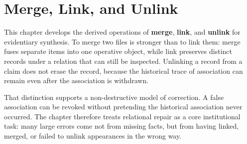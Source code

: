 
\chapter{Merge, Link, and Unlink}
\label{ch:ch049}

This chapter develops the derived operations of \textbf{merge}, \textbf{link}, and \textbf{unlink} for evidentiary synthesis. To merge two files is stronger than to link them: merge fuses separate items into one operative object, while link preserves distinct records under a relation that can still be inspected. Unlinking a record from a claim does not erase the record, because the historical trace of association can remain even after the association is withdrawn.

That distinction supports a non-destructive model of correction. A false association can be revoked without pretending the historical association never occurred. The chapter therefore treats relational repair as a core institutional task: many large errors come not from missing facts, but from having linked, merged, or failed to unlink appearances in the wrong way.
